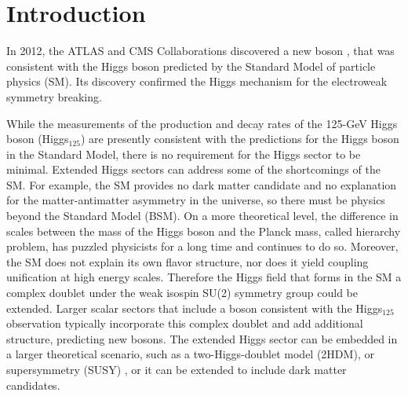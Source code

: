 \documentclass[a4paper, oneside, 11pt, openright]{book}
\begin{document}
	\clearpage\null\thispagestyle{empty}\newpage
	
	\tableofcontents
	
	\chapter*{Introduction}
	
		In 2012, the ATLAS and CMS Collaborations discovered a new boson \cite{higgs_atlas},\cite{higgs_cms} that was consistent with the Higgs boson predicted by the Standard Model of particle physics (SM). Its discovery confirmed the Higgs mechanism for the electroweak symmetry breaking.
		
		While the measurements of the production and decay rates of the 125-GeV Higgs boson (Higgs$_{125}$) are presently consistent with the predictions for the Higgs boson in the Standard Model, there is no requirement for the Higgs sector to be minimal. Extended Higgs sectors can address some of the shortcomings of the SM. For example, the SM provides no dark matter candidate and no explanation for the matter-antimatter asymmetry in the universe, so there must be physics beyond the Standard Model (BSM). On a more theoretical level, %
		the difference in scales between the mass of the Higgs boson and the Planck mass, called hierarchy problem, has puzzled physicists for a long time and continues to do so. Moreover, the SM does not explain its own flavor structure, nor does it yield coupling unification at high energy scales\cite{ext_higgs}. Therefore the Higgs field that forms in the SM a complex doublet under the weak isospin SU(2) symmetry group could be extended. Larger scalar sectors that include a boson consistent with the Higgs$_{125}$ observation typically incorporate this complex doublet and add additional structure, predicting new bosons. The extended Higgs sector can be embedded in a larger theoretical scenario, such as a two-Higgs-doublet model (2HDM)\cite{Branco_2012}, or supersymmetry (SUSY) \cite{dine_2016}, or it can be extended to include dark matter candidates.
		
\end{document}

